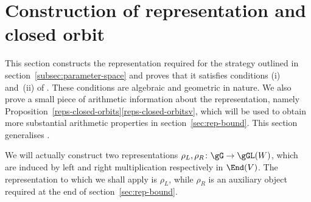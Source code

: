 \section{Construction of representation and closed orbit} \label{sec:representation}

This section constructs the representation required for the strategy outlined in section~\ref{subsec:parameter-space} and proves that it satisfies conditions (i) and~(ii) of \cite[Th.\,1.2]{QRTUI}.
These conditions are algebraic and geometric in nature.
We also prove a small piece of arithmetic information about the representation, namely Proposition~\ref{reps-closed-orbits}\eqref{reps-closed-orbitsv}, which will be used to obtain more substantial arithmetic properties in section~\ref{sec:rep-bound}.
This section generalises \cite[\S\S 5.2 \&~5.3]{QRTUI}.

We will actually construct two representations $\rho_L, \rho_R \colon \gG \to \gGL(W)$, which are induced by left and right multiplication respectively in $\End(V)$.
The representation to which we shall apply \cite[Th.\,1.2]{QRTUI} is $\rho_L$, while $\rho_R$ is an auxiliary object required at the end of section~\ref{sec:rep-bound}.

